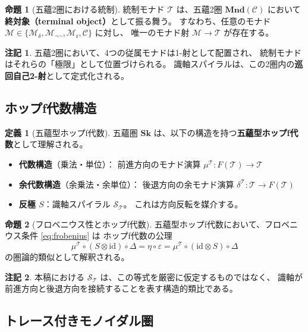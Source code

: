 \documentclass[11pt,a4paper]{article}
\theoremstyle{definition}
\newtheorem{definition}{定義}[section]
\newtheorem{proposition}{命題}[section]
\newtheorem{remark}{注記}[section]
\newcommand{\Sk}{\mathbf{Sk}}
\newcommand{\id}{\mathrm{id}}
\newcommand{\Mdelta}{\mathcal{M}_{\delta}}
\newcommand{\Mneg}{\mathcal{M}_{\neg\neg}}
\newcommand{\Mr}{\mathcal{M}_{\mathrm{r}}}
\newcommand{\Mc}{\mathcal{C}}
\newcommand{\T}{\mathcal{T}}
\newcommand{\SpiralT}{\mathcal{S}_{\mathcal{T}}}
\newcommand{\fold}{\mu}
\newcommand{\unfold}{\delta}
\begin{document}
\begin{proposition}[五蘊2圏における統制]
統制モナド $\T$ は、五蘊2圏 $\mathbf{Mnd}(\mathcal{C})$ において
\textbf{終対象（terminal object）}として振る舞う。
すなわち、任意のモナド $\mathcal{M} \in \{\Mdelta, \Mneg, \Mr, \Mc\}$ に対し、
唯一のモナド射 $\mathcal{M} \to \T$ が存在する。
\end{proposition}

\begin{remark}
五蘊2圏において、4つの従属モナドは1-射として配置され、
統制モナドはそれらの「極限」として位置づけられる。
識軸スパイラルは、この2圏内の\textbf{巡回自己2-射}として定式化される。
\end{remark}

\subsection{ホップf代数構造}

\begin{definition}[五蘊型ホップf代数]
五蘊圏 $\Sk$ は、以下の構造を持つ\textbf{五蘊型ホップf代数}として理解される。

\begin{itemize}
\item \textbf{代数構造}（乗法・単位）：
  前進方向のモナド演算 $\fold^\T : F(\T) \to \T$
\item \textbf{余代数構造}（余乗法・余単位）：
  後退方向の余モナド演算 $\unfold^\T : \T \to F(\T)$
\item \textbf{反極 $S$}：識軸スパイラル $\SpiralT$。
  これは方向反転を媒介する。
\end{itemize}
\end{definition}

\begin{proposition}[フロベニウス性とホップf代数]
五蘊型ホップf代数において、フロベニウス条件 \eqref{eq:frobenius} は
ホップf代数の公理
\begin{equation}
\fold^\T \circ (S \otimes \id) \circ \Delta 
= \eta \circ \varepsilon 
= \fold^\T \circ (\id \otimes S) \circ \Delta
\end{equation}
の圏論的類似として解釈される。
\end{proposition}

\begin{remark}
本稿における $\SpiralT$ は、この等式を厳密に仮定するものではなく、
識軸が前進方向と後退方向を接続することを表す構造的類比である。
\end{remark}

\subsection{トレース付きモノイダル圏}
\end{document}
